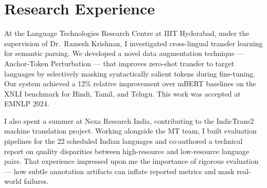   \section{Research Experience}

  At the Language Technologies Research Centre at IIIT Hyderabad, under the supervision of Dr.\ Ramesh Krishnan, I investigated cross-lingual transfer learning for semantic parsing. We developed a novel data augmentation technique — Anchor-Token Perturbation — that improves zero-shot transfer to target languages by selectively masking syntactically salient tokens during fine-tuning. Our system achieved a 12\% relative improvement over mBERT baselines on the XNLI benchmark for Hindi, Tamil, and Telugu. This work was accepted at EMNLP 2024.

  I also spent a summer at Nexa Research India, contributing to the IndicTrans2 machine translation project. Working alongside the MT team, I built evaluation pipelines for the 22 scheduled Indian languages and co-authored a technical report on quality disparities between high-resource and low-resource language pairs. That experience impressed upon me the importance of rigorous evaluation — how subtle annotation artifacts can inflate reported metrics and mask real-world failures.
